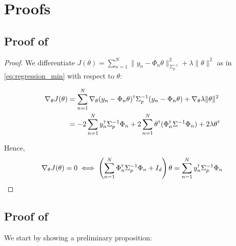 \documentclass{article}
\begin{document}
\section{Proofs}
\label{sec:proof}

\subsection{Proof of }

\begin{proof}
We differentiate $J(\theta) = \sum_{n=1}^N \|y_n -\Phi_n\theta\|_{\Sigma_p^{-1}}^2 + \lambda\|\theta\|_{}^2$ as in \eqref{eq:regression_min} with respect to $\theta$:

\begin{align*}
    \nabla_{\theta} J(\theta) &= \sum_{n=1}^N\nabla_{\theta} (y_n - \Phi_n\theta)^{\mathsf{\scriptscriptstyle T}}\Sigma_p^{-1}(y_n - \Phi_n\theta) + \nabla_{\theta} \lambda\|\theta\|_{}^2\\
    &= -2\sum_{n=1}^N y_n^{\mathsf{\scriptscriptstyle T}}\Sigma_p^{-1}\Phi_n + 2\sum_{n=1}^N\theta^{\mathsf{\scriptscriptstyle T}}(\Phi_n^{\mathsf{\scriptscriptstyle T}}\Sigma^{-1}\Phi_n) +  2 \lambda \theta^{\mathsf{\scriptscriptstyle T}}
\end{align*}

Hence,
\begin{align*}
    \nabla_{\theta} J(\theta) = 0 \iff \left(\sum_{n=1}^N\Phi_n^{\mathsf{\scriptscriptstyle T}}\Sigma_p^{-1}\Phi_n + I_d\right)\theta = \sum_{n=1}^N y_n^{\mathsf{\scriptscriptstyle T}}\Sigma_p^{-1}\Phi_n
\end{align*}
\end{proof}

\subsection{Proof of }

We start by showing a preliminary proposition:
\end{document}
